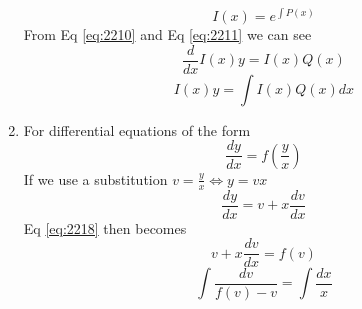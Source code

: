 \documentclass[11pt,titlepage]{article}
\numberwithin{equation}{subsection}
\begin{document}
\begin{enumerate}
\begin{equation}
    I(x)=e^{\int P(x)}
\end{equation}
From Eq \eqref{eq:2210} and Eq \eqref{eq:2211} we can see
\begin{equation}
    \frac{d}{dx}I(x)y=I(x)Q(x)
\end{equation}
\begin{equation}
    I(x)y=\int I(x)Q(x)dx
\end{equation}
\item For differential equations of the form 
\begin{equation}\label{eq:2218}
    \frac{dy}{dx}=f\left(\frac{y}{x}\right)
\end{equation}
If we use a substitution $v=\frac{y}{x}\Longleftrightarrow y=vx$
\begin{equation}
    \frac{dy}{dx}=v+x\frac{dv}{dx}
\end{equation}
Eq \eqref{eq:2218} then becomes 
\begin{equation}
    v+x\frac{dv}{dx}=f(v)
\end{equation}
\begin{equation}
    \int \frac{dv}{f(v)-v}=\int\frac{dx}{x}
\end{equation}
\end{enumerate}
\end{document}
